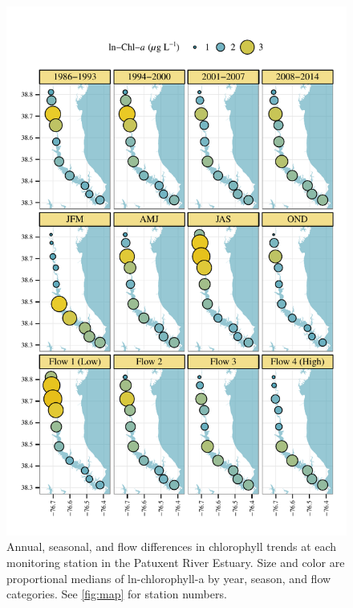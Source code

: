 \documentclass[letterpaper,12pt,oneside]{article}\usepackage[]{graphicx}\usepackage[]{color}
\makeatletter
\def\maxwidth{ %
  \ifdim\Gin@nat@width>\linewidth
    \linewidth
  \else
    \Gin@nat@width
  \fi
}
\makeatother
\begin{document}
\begin{figure}[!ht]

{\centering \includegraphics[width=\maxwidth]{figs/chlyrmofl-1} 

}

\caption{Annual, seasonal, and flow differences in chlorophyll trends at each monitoring station in the Patuxent River Estuary.  Size and color are proportional medians of ln-chlorophyll-a by year, season, and flow categories. See \cref{fig:map} for station numbers.}\label{fig:chlyrmofl}
\end{figure}



\end{document}
